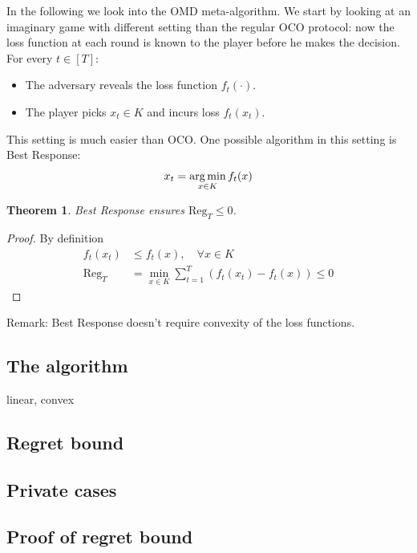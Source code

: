 \documentclass[11pt]{article}
\newtheorem{theorem}{Theorem}[section]
\theoremstyle{definition}
\theoremstyle{definition}
\newcommand{\pth}[1]{\left( #1\right)}                 %
\newcommand{\brk}[1]{\left[ #1\right]}                 %
\newcommand{\Kset}{\ensuremath{K}}
\renewcommand{\regret}{\ensuremath{\mathrm{{Reg}}}}
\begin{document}
In the following we look into the OMD meta-algorithm.
We start by looking at an imaginary game with different setting than the regular OCO protocol: now the loss function at each round is known to the player before he makes the decision.
For every $t \in \brk{T} $:
\begin{itemize}
\item The adversary reveals the loss function $ f_t(\cdot) $.
\item The player picks $ x_t \in \Kset $ and incurs loss $ f_t(x_t) $.
\end{itemize}

This setting is much easier than OCO. One possible algorithm in this setting is Best Response:
\begin{equation*}
x_t = \argmin_{x \in \Kset} f_t(x)
\end{equation*} 

\begin{theorem}
Best Response ensures $ \regret_T \leq 0 $.
\end{theorem}

\begin{proof}
By definition
\begin{equation*}
\begin{aligned}
f_t(x_t) & \leq f_t(x), \quad \forall x \in \Kset
\\
\regret_T & = \min_{x \in \Kset} \sum_{t=1}^{T} \pth{f_t(x_t) - f_t(x)} \leq 0
\end{aligned}
\end{equation*}
\end{proof}

Remark: Best Response doesn't require convexity of the loss functions.


\subsection{The algorithm}
linear, convex

\subsection{Regret bound}

\subsection{Private cases}

\subsection{Proof of regret bound}
\end{document}
